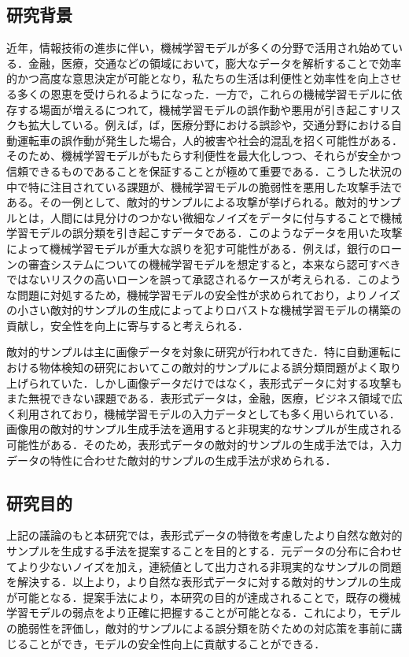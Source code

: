 \subsection{研究背景}
近年，情報技術の進歩に伴い，機械学習モデルが多くの分野で活用され始めている．金融，医療，交通などの領域において，膨大なデータを解析することで効率的かつ高度な意思決定が可能となり，私たちの生活は利便性と効率性を向上させる多くの恩恵を受けられるようになった．一方で，これらの機械学習モデルに依存する場面が増えるにつれて，機械学習モデルの誤作動や悪用が引き起こすリスクも拡大している。例えば，ば，医療分野における誤診や，交通分野における自動運転車の誤作動が発生した場合，人的被害や社会的混乱を招く可能性がある．そのため、機械学習モデルがもたらす利便性を最大化しつつ、それらが安全かつ信頼できるものであることを保証することが極めて重要である．こうした状況の中で特に注目されている課題が、機械学習モデルの脆弱性を悪用した攻撃手法である。その一例として、敵対的サンプルによる攻撃が挙げられる。敵対的サンプルとは，人間には見分けのつかない微細なノイズをデータに付与することで機械学習モデルの誤分類を引き起こすデータである．このようなデータを用いた攻撃によって機械学習モデルが重大な誤りを犯す可能性がある．例えば，銀行のローンの審査システムについての機械学習モデルを想定すると，本来なら認可すべきではないリスクの高いローンを誤って承認されるケースが考えられる．このような問題に対処するため，機械学習モデルの安全性が求められており，よりノイズの小さい敵対的サンプルの生成によってよりロバストな機械学習モデルの構築の貢献し，安全性を向上に寄与すると考えられる．

敵対的サンプルは主に画像データを対象に研究が行われてきた．特に自動運転における物体検知の研究においてこの敵対的サンプルによる誤分類問題がよく取り上げられていた．しかし画像データだけではなく，表形式データに対する攻撃もまた無視できない課題である．表形式データは，金融，医療，ビジネス領域で広く利用されており，機械学習モデルの入力データとしても多く用いられている．画像用の敵対的サンプル生成手法を適用すると非現実的なサンプルが生成される可能性がある．そのため，表形式データの敵対的サンプルの生成手法では，入力データの特性に合わせた敵対的サンプルの生成手法が求められる．

\subsection{研究目的}
上記の議論のもと本研究では，表形式データの特徴を考慮したより自然な敵対的サンプルを生成する手法を提案することを目的とする．元データの分布に合わせてより少ないノイズを加え，連続値として出力される非現実的なサンプルの問題を解決する．以上より，より自然な表形式データに対する敵対的サンプルの生成が可能となる．提案手法により，本研究の目的が達成されることで，既存の機械学習モデルの弱点をより正確に把握することが可能となる．これにより，モデルの脆弱性を評価し，敵対的サンプルによる誤分類を防ぐための対応策を事前に講じることができ，モデルの安全性向上に貢献することができる．